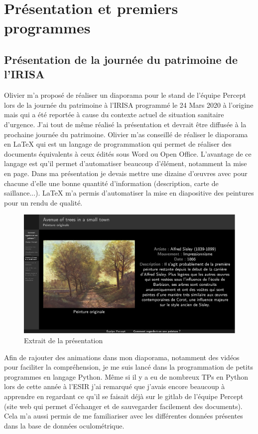 \chapter{Présentation et premiers programmes}

\section{Présentation de la journée du patrimoine de l'IRISA}

\par
Olivier m'a proposé de réaliser un diaporama pour le stand de l'équipe Percept lors de la journée du patrimoine à l'IRISA programmé le 24 Mars 2020 à l'origine mais qui a été reportée à cause du contexte actuel de situation sanitaire d'urgence. J'ai tout de même réalisé la présentation et devrait être diffusée à la prochaine journée du patrimoine. Olivier m'as conseillé de réaliser le diaporama en \LaTeX{} qui est un langage de programmation qui permet de réaliser des documents équivalents à ceux édités sous Word ou Open Office. L'avantage de ce langage est qu'il permet d'automatiser beaucoup d'élément, notamment la mise en page. Dans ma présentation je devais mettre une dizaine d'\oe{}uvres avec pour chacune d'elle une bonne quantité d'information (description, carte de saillance...). \LaTeX{} m'a permis d'automatiser la mise en diapositive des peintures pour un rendu de qualité.

\begin{figure}[!ht]
    \centering
    \includegraphics[width=0.7\linewidth]{datas/exemple_diapo.png}
    \caption{Extrait de la présentation}
    \label{ex_diapo}
\end{figure}

\par
Afin de rajouter des animations dans mon diaporama, notamment des vidéos pour faciliter la compréhension, je me suis lancé dans la programmation de petits programmes en langage Python. Même si il y a eu de nombreux TPs en Python lors de cette année à l'ESIR j'ai remarqué que j'avais encore beaucoup à apprendre en regardant ce qu'il se faisait déjà sur le gitlab de l'équipe Percept (site web qui permet d'échanger et de sauvegarder facilement des documents). Cela m'a aussi permis de me familiariser avec les différentes données présentes dans la base de données oculométrique.

